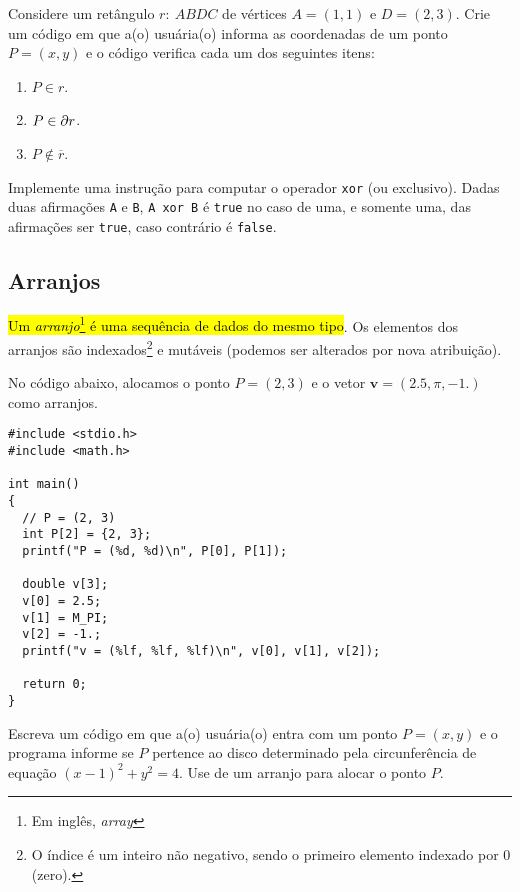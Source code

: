 \documentclass[12pt]{article}
\begin{document}
\begin{exr}
  Considere um retângulo $r: ~ABDC$ de vértices $A = (1, 1)$ e $D = (2, 3)$. Crie um código em que a(o) usuária(o) informa as coordenadas de um ponto $P = (x, y)$ e o código verifica cada um dos seguintes itens:
  \begin{enumerate}
  \item $P\in r$.
  \item $P\in \partial r$.
  \item $P\not\in \overline{r}$.
  \end{enumerate}
\end{exr}

\begin{exr}
  Implemente uma instrução para computar o operador \lstinline+xor+ (ou exclusivo). Dadas duas afirmações \lstinline+A+ e \lstinline+B+, \lstinline+A xor B+ é \lstinline+true+ no caso de uma, e somente uma, das afirmações ser \lstinline+true+, caso contrário é \lstinline+false+.
\end{exr}

\subsection{Arranjos}

\hl{Um \emph{arranjo}\footnote{Em inglês, \textit{array}} é uma sequência de dados do mesmo tipo}. Os elementos dos arranjos são indexados\footnote{O índice é um inteiro não negativo, sendo o primeiro elemento indexado por $0$ (zero).} e mutáveis (podemos ser alterados por nova atribuição).

\begin{ex}
  No código abaixo, alocamos o ponto $P = (2, 3)$ e o vetor $\pmb{v} = (2.5, \pi, -1.)$ como arranjos.
\begin{lstlisting}
#include <stdio.h>
#include <math.h>

int main()
{
  // P = (2, 3)
  int P[2] = {2, 3};
  printf("P = (%d, %d)\n", P[0], P[1]);
  
  double v[3];
  v[0] = 2.5;
  v[1] = M_PI;
  v[2] = -1.;
  printf("v = (%lf, %lf, %lf)\n", v[0], v[1], v[2]);
  
  return 0;
}
\end{lstlisting}
\end{ex}

\begin{exr}
  Escreva um código em que a(o) usuária(o) entra com um ponto $P = (x, y)$ e o programa informe se $P$ pertence ao disco determinado pela circunferência de equação $(x-1)^2 + y^2 = 4$. Use de um arranjo para alocar o ponto $P$.
\end{exr}
\end{document}

